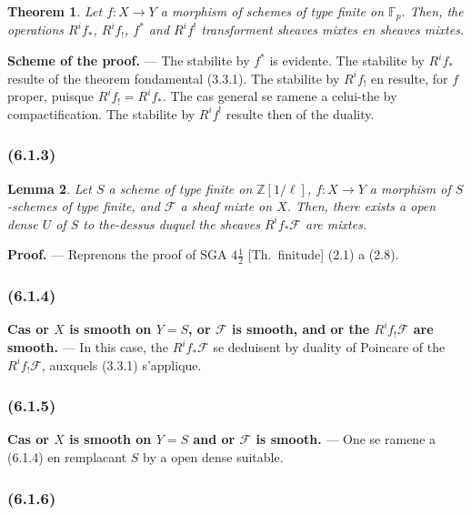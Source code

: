 \documentclass[12pt,a4paper]{article}
\theoremstyle{plain}
\newtheorem{theorem}{Theorem}[section]
\newtheorem{lemma}[theorem]{Lemma}
\theoremstyle{definition}
\theoremstyle{remark}
\newcommand{\bbZ}{\mathbb{Z}}
\newcommand{\scrF}{\mathscr{F}}
\newcommand{\Fp}{\mathbb{F}_p}
\begin{document}
\begin{theorem}
Let $f : X \to Y$ a morphism of schemes of type finite on $\Fp$. Then, the operations $R^i f_*$, $R^i f_!$, $f^*$ and $R^i f^!$ transforment sheaves mixtes en sheaves mixtes.
\end{theorem}

\textbf{Scheme of the proof.} --- The stabilite by $f^*$ is evidente. The stabilite by $R^i f_*$ resulte of the theorem fondamental (3.3.1). The stabilite by $R^i f_!$ en resulte, for $f$ proper, puisque $R^i f_! = R^i f_*$. The cas general se ramene a celui-the by compactification. The stabilite by $R^i f^!$ resulte then of the duality.

\subsubsection*{\textup{(6.1.3)}}

\begin{lemma}
Let $S$ a scheme of type finite on $\bbZ[1/\ell]$, $f : X \to Y$ a morphism of $S$-schemes of type finite, and $\scrF$ a sheaf mixte on $X$. Then, there exists a open dense $U$ of $S$ to the-dessus duquel the sheaves $R^i f_* \scrF$ are mixtes.
\end{lemma}

\textbf{Proof.} --- Reprenons the proof of SGA $4\frac{1}{2}$ [Th.~finitude] (2.1) a (2.8).

\subsubsection*{\textup{(6.1.4)}}

\textbf{Cas or $X$ is smooth on $Y = S$, or $\scrF$ is smooth, and or the $R^i f_! \scrF$ are smooth.} --- In this case, the $R^i f_* \scrF$ se deduisent by duality of Poincare of the $R^i f_! \scrF$, auxquels (3.3.1) s'applique.

\subsubsection*{\textup{(6.1.5)}}

\textbf{Cas or $X$ is smooth on $Y = S$ and or $\scrF$ is smooth.} --- One se ramene a (6.1.4) en remplacant $S$ by a open dense suitable.

\subsubsection*{\textup{(6.1.6)}}
\end{document}
